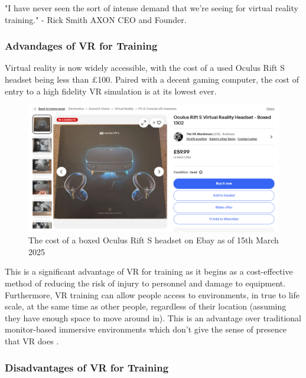 \documentclass[12pt]{article}
\begin{document}
"I have never seen the sort of intense demand that we're seeing for virtual reality training." - Rick Smith AXON CEO and Founder. \cite{axonYouTube}

\subsubsection{Advandages of VR for Training}

Virtual reality is now widely accessible, with the cost of a used Oculus Rift S headset being less than £100. Paired with a decent gaming computer, the cost of entry to a high fidelity VR simulation is at its lowest ever.

\begin{figure}[h]
  \centering
  \begin{minipage}[b]{0.9\linewidth}
    \includegraphics[width=\linewidth]{images/ebay-screenshot-rift-s.png}
    \caption{The cost of a boxed Oculus Rift S headset on Ebay as of 15th March 2025}
    \label{fig:ebayOculusRiftS}
  \end{minipage}
\end{figure}


This is a significant advantage of VR for training as it begins as a cost-effective method of reducing the risk of injury to personnel and damage to equipment. Furthermore, VR training can allow people access to environments, in true to life scale, at the same time as other people, regardless of their location (assuming they have enough space to move around in). This is an advantage over traditional monitor-based immersive environments which don't give the sense of presence that VR does \cite{makransky2017development}.

\subsubsection{Disadvantages of VR for Training}
\end{document}
